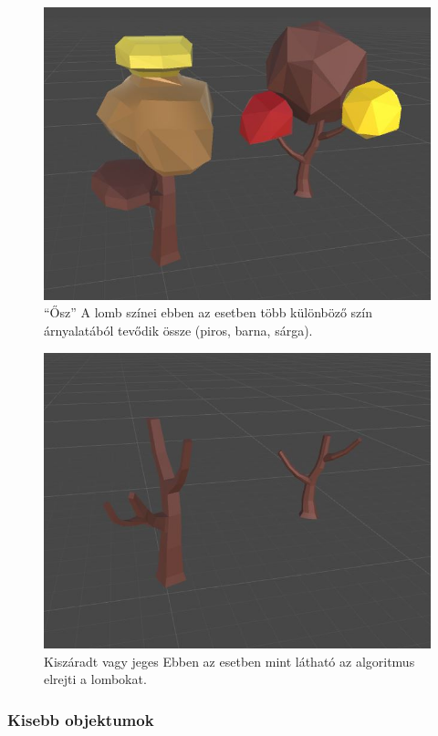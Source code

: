 \begin{figure}[h]
\centering
\includegraphics[scale=0.5]{kepek/img11_4_7_2.JPG}
\caption{“Ősz” A lomb színei ebben az esetben több különböző szín árnyalatából tevődik össze (piros, barna, sárga).}
\label{fig:img11_4_7_2}
\end{figure}

\begin{figure}[h]
\centering
\includegraphics[scale=0.5]{kepek/img11_4_7_3.JPG}
\caption{Kiszáradt vagy jeges Ebben az esetben mint látható az algoritmus elrejti a lombokat.}
\label{fig:img11_4_7_3}
\end{figure}

\subsubsection{Kisebb objektumok}

